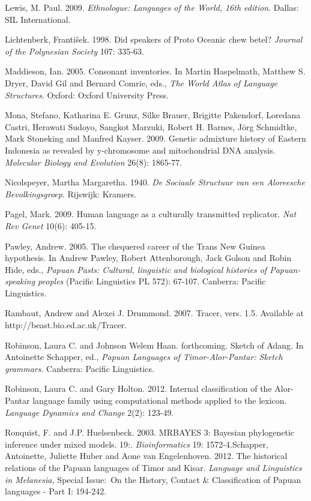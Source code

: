 Lewis, M. Paul. 2009. \textit{Ethnologue: Languages of the World, 16th edition}. Dallas: SIL International.

Lichtenberk, Franti\v{s}ek. 1998. Did speakers of Proto Oceanic chew betel? \textit{Journal of the Polynesian Society} 107: 335-63.

Maddieson, Ian. 2005. Consonant inventories. In Martin Haspelmath, Matthew S. Dryer, David Gil and Bernard Comrie, eds., \textit{The World Atlas of Language Structures}. Oxford: Oxford University Press.

Mona, Stefano, Katharina E. Grunz, Silke Brauer, Brigitte Pakendorf, Loredana Castri, Herawati Sudoyo, Sangkot Marzuki, Robert H. Barnes, J\"org Schmidtke, Mark Stoneking and Manfred Kayser. 2009. Genetic admixture history of Eastern Indonesia as revealed by y-chromosome and mitochondrial DNA analysis. \textit{Molecular Biology and Evolution} 26(8): 1865-77.

Nicolspeyer, Martha Margaretha. 1940. \textit{De Sociaale Structuur van een Aloreesche Bevolkingsgroep}. Rijswijk: Kramers.

Pagel, Mark. 2009. Human language as a culturally transmitted replicator. \textit{Nat Rev Genet} 10(6): 405-15.

Pawley, Andrew. 2005. The chequered career of the Trans New Guinea hypothesis. In Andrew Pawley, Robert Attenborough, Jack Golson and Robin Hide, eds., \textit{Papuan Pasts: Cultural, linguistic and biological histories of Papuan-speaking peoples }(Pacific Linguistics PL 572): 67-107. Canberra: Pacific Linguistics.

Rambaut, Andrew and Alexei J. Drummond. 2007. Tracer, vers. 1.5. Available at http://beast.bio.ed.ac.uk/Tracer.

Robinson, Laura C. and Johnson Welem Haan. forthcoming. Sketch of Adang. In Antoinette Schapper, ed., \textit{Papuan Languages of Timor-Alor-Pantar: Sketch grammars}. Canberra: Pacific Linguistics.

Robinson, Laura C. and Gary Holton. 2012. Internal classification of the Alor-Pantar language family using computational methods applied to the lexicon. \textit{Language Dynamics and Change} 2(2): 123-49.

Ronquist, F.  and J.P. Huelsenbeck. 2003. MRBAYES 3: Bayesian phylogenetic inference under mixed models. 19:. \textit{Bioinformatics} 19: 1572-4.Schapper, Antoinette, Juliette Huber and Aone van Engelenhoven. 2012. The historical relations of the Papuan languages of Timor and Kisar. \textit{Language and Linguistics in Melanesia, }Special Issue:~On the History, Contact \& Classification of Papuan languages - Part I: 194-242.

